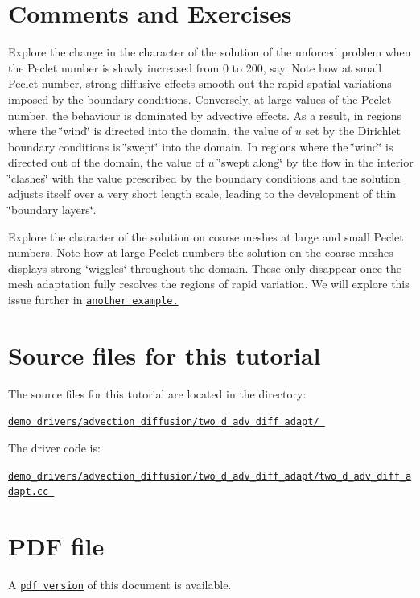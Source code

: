 

\hypertarget{index_com}{}\section{Comments and Exercises}\label{index_com}

\begin{DoxyEnumerate}
\item Explore the change in the character of the solution of the unforced problem when the Peclet number is slowly increased from 0 to 200, say. Note how at small Peclet number, strong diffusive effects smooth out the rapid spatial variations imposed by the boundary conditions. Conversely, at large values of the Peclet number, the behaviour is dominated by advective effects. As a result, in regions where the \char`\"{}wind\char`\"{} is directed into the domain, the value of $ u $ set by the Dirichlet boundary conditions is \char`\"{}swept\char`\"{} into the domain. In regions where the \char`\"{}wind\char`\"{} is directed out of the domain, the value of $ u $ \char`\"{}swept along\char`\"{} by the flow in the interior \char`\"{}clashes\char`\"{} with the value prescribed by the boundary conditions and the solution adjusts itself over a very short length scale, leading to the development of thin \char`\"{}boundary layers\char`\"{}.
\item Explore the character of the solution on coarse meshes at large and small Peclet numbers. Note how at large Peclet numbers the solution on the coarse meshes displays strong \char`\"{}wiggles\char`\"{} throughout the domain. These only disappear once the mesh adaptation fully resolves the regions of rapid variation. We will explore this issue further in \href{../../two_d_adv_diff_SUPG/html/index.html}{\tt another example.}
\end{DoxyEnumerate}



 

\hypertarget{index_sources}{}\section{Source files for this tutorial}\label{index_sources}

\begin{DoxyItemize}
\item The source files for this tutorial are located in the directory\+: \begin{center} \href{../../../../demo_drivers/advection_diffusion/two_d_adv_diff_adapt/}{\tt demo\+\_\+drivers/advection\+\_\+diffusion/two\+\_\+d\+\_\+adv\+\_\+diff\+\_\+adapt/ } \end{center} 
\item The driver code is\+: \begin{center} \href{../../../../demo_drivers/advection_diffusion/two_d_adv_diff_adapt/two_d_adv_diff_adapt.cc}{\tt demo\+\_\+drivers/advection\+\_\+diffusion/two\+\_\+d\+\_\+adv\+\_\+diff\+\_\+adapt/two\+\_\+d\+\_\+adv\+\_\+diff\+\_\+adapt.\+cc } \end{center} 
\end{DoxyItemize}

 

 \hypertarget{index_pdf}{}\section{P\+D\+F file}\label{index_pdf}
A \href{../latex/refman.pdf}{\tt pdf version} of this document is available. 
